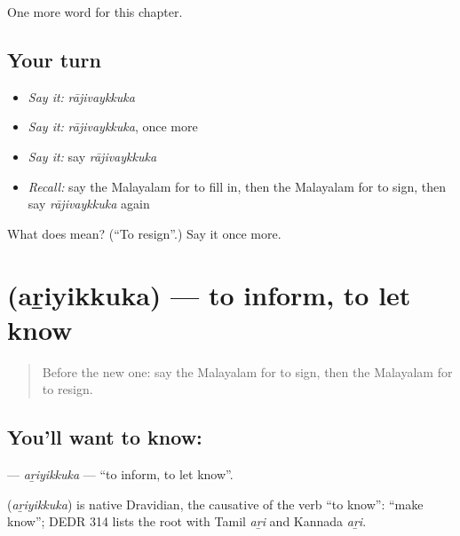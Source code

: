 \begin{grammarlens}[title={What you've built}]
One more word for this chapter.
\end{grammarlens}

\subsection*{Your turn}
\begin{itemize}
\raggedright
  \item \emph{Say it:} \emph{rājivaykkuka}
  \item \emph{Say it:} \emph{rājivaykkuka}, once more
  \item \emph{Say it:} say \emph{rājivaykkuka}
  \item \emph{Recall:} say the Malayalam for to fill in, then the Malayalam for to sign, then say \emph{rājivaykkuka} again
\end{itemize}

\begin{tcolorbox}[breakable,colback=teal!4,colframe=teal!35!black,title={Before you move on}]
What does  mean? (\textquotedblleft{}To resign\textquotedblright{}.) Say it once more.
\end{tcolorbox}
\section[\texorpdfstring{\ml{അറിയിക്കുക} (aṟiyikkuka)}{അറിയിക്കുക (aṟiyikkuka)}]{ (aṟiyikkuka) — to inform, to let know}

\label{lesson:ML-C185-ariyikkuka}



\begin{quote}
Before the new one: say the Malayalam for to sign, then the Malayalam for to resign.
\end{quote}

\subsection*{You'll want to know: }
\textbf{} — \emph{aṟiyikkuka} — \textquotedblleft{}to inform, to let know\textquotedblright{}.

\begin{cousinweb}
\textbf{} (\emph{aṟiyikkuka}) is native Dravidian, the causative of the verb \textquotedblleft{}to know\textquotedblright{}: \textquotedblleft{}make know\textquotedblright{}; DEDR 314 lists the root with Tamil \emph{aṟi} and Kannada \emph{aṟi}.
\end{cousinweb}


